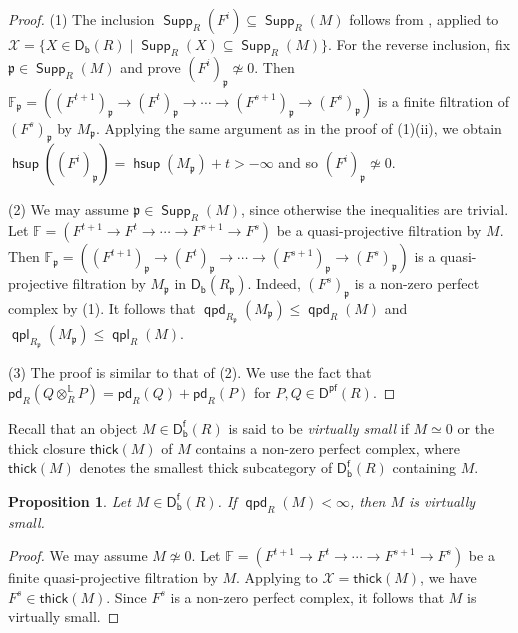 \documentclass[10pt, a4paper,reqno]{amsart}
\newtheorem{prop}[prop]{Proposition}
\theoremstyle{definition}
\theoremstyle{remark}
\numberwithin{equation}{thm}
\def\FF{\mathbb{F}}
\def\cX{\mathcal{X}}
\def\fp{\mathfrak{p}}
\def\Supp{\operatorname{\mathsf{Supp}}}
\def\Db{\mathsf{D_b}}
\def\Dfb{\mathsf{D^f_b}}
\def\Pf{\mathsf{D^{pf}}}
\def\ltensor{\otimes^{\mathbb{L}}}
\def\hsup{\operatorname{\mathsf{hsup}}}
\def\thick{\mathsf{thick}}
\def\pd{\mathsf{pd}}
\def\qpd{\operatorname{\mathsf{qpd}}}
\def\qpl{\operatorname{\mathsf{qpl}}}
\begin{document}
\begin{proof}
(1) The inclusion $\Supp_R(F^i) \subseteq \Supp_R(M)$ follows from , applied to $\cX = \{X \in \Db(R) \mid \Supp_R(X) \subseteq \Supp_R(M)\}$.
For the reverse inclusion, fix $\fp \in \Supp_R(M)$ and prove $(F^i)_\fp \not\simeq 0$.
Then $\FF_\fp = ((F^{t+1})_\fp \to (F^{t})_\fp \to \cdots \to (F^{s+1})_\fp \to (F^s)_\fp)$ is a finite filtration of $(F^s)_\fp$ by $M_\fp$.
Applying the same argument as in the proof of (1)(ii), we obtain $\hsup((F^i)_\fp) = \hsup(M_\fp) + t > -\infty$ and so $(F^i)_\fp \not\simeq 0$.

(2) We may assume $\fp \in \Supp_R(M)$, since otherwise the inequalities are trivial.
Let $\FF = (F^{t+1} \to F^{t} \to \cdots \to F^{s+1} \to F^s)$ be a quasi-projective filtration by $M$.
Then $\FF_\fp = ((F^{t+1})_\fp \to (F^{t})_\fp \to \cdots \to (F^{s+1})_\fp \to (F^s)_\fp)$ is a quasi-projective filtration by $M_\fp$ in $\Db(R_\fp)$.
Indeed, $(F^s)_\fp$ is a non-zero perfect complex by (1).
It follows that $\qpd_{R_\fp}(M_\fp) \le \qpd_{R}(M)$ and $\qpl_{R_\fp}(M_\fp) \le \qpl_{R}(M)$.

(3) The proof is similar to that of (2).
We use the fact that $\pd_R(Q \ltensor_R P) = \pd_R(Q) + \pd_R(P)$ for $P,Q \in \Pf(R)$.
\end{proof}


Recall that an object $M \in \Dfb(R)$ is said to be {\em virtually small} if $M \simeq 0$ or the thick closure $\thick(M)$ of $M$ contains a non-zero perfect complex, where $\thick(M)$ denotes the smallest thick subcategory of $\Dfb(R)$ containing $M$.

\begin{prop}\label{vir}
Let $M \in \Dfb(R)$.
If $\qpd_R(M) < \infty$, then $M$ is virtually small.	
\end{prop}

\begin{proof}
We may assume $M \not\simeq 0$.
Let $\FF = (F^{t+1} \to F^t \to \cdots \to F^{s+1} \to F^s)$ be a finite quasi-projective filtration by $M$.
Applying  to $\cX = \thick(M)$, we have $F^s \in \thick(M)$.
Since $F^s$ is a non-zero perfect complex, it follows that $M$ is virtually small.
\end{proof}
\end{document}
